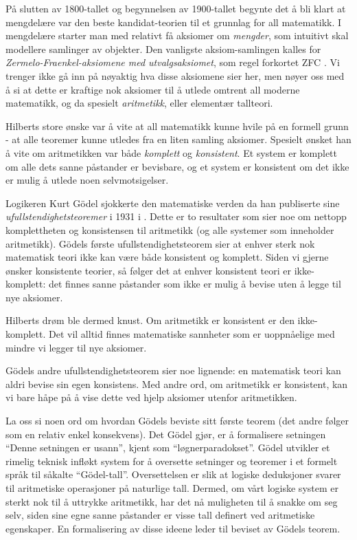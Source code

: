 \documentclass[12pt, norsk]{article}
\begin{document}
På slutten av 1800-tallet og begynnelsen av 1900-tallet begynte det å bli klart at mengdelære var den beste kandidat-teorien til et grunnlag for all matematikk. I mengdelære starter man med relativt få aksiomer om \emph{mengder}, som intuitivt skal modellere samlinger av objekter. Den vanligste aksiom-samlingen kalles for \emph{Zermelo-Fraenkel-aksiomene med utvalgsaksiomet}, som regel forkortet ZFC \cite{wiki_zfc}. Vi trenger ikke gå inn på nøyaktig hva disse aksiomene sier her, men nøyer oss med å si at dette er kraftige nok aksiomer til å utlede omtrent all moderne matematikk, og da spesielt \emph{aritmetikk}, eller elementær tallteori.

Hilberts store ønske var å vite at all matematikk kunne hvile på en formell grunn - at alle teoremer kunne utledes fra en liten samling aksiomer. Spesielt ønsket han å vite om aritmetikken var både \emph{komplett} og \emph{konsistent}. Et system er komplett om alle dets sanne påstander er bevisbare, og et system er konsistent om det ikke er mulig å utlede noen selvmotsigelser. 

Logikeren Kurt Gödel sjokkerte den matematiske verden da han publiserte sine \emph{ufullstendighetsteoremer} i 1931 i \cite{godel_formal}. Dette er to resultater som sier noe om nettopp komplettheten og konsistensen til aritmetikk (og alle systemer som inneholder aritmetikk). Gödels første ufullstendighetsteorem sier at enhver sterk nok matematisk teori ikke kan være både konsistent og komplett. Siden vi gjerne ønsker konsistente teorier, så følger det at enhver konsistent teori er ikke-komplett: det finnes sanne påstander som ikke er mulig å bevise uten å legge til nye aksiomer. 

Hilberts drøm ble dermed knust. Om aritmetikk er konsistent er den ikke-komplett. Det vil alltid finnes matematiske sannheter som er uoppnåelige med mindre vi legger til nye aksiomer.

Gödels andre ufullstendighetsteorem sier noe lignende: en matematisk teori kan aldri bevise sin egen konsistens. Med andre ord, om aritmetikk er konsistent, kan vi bare håpe på å vise dette ved hjelp aksiomer utenfor aritmetikken.

La oss si noen ord om hvordan Gödels beviste sitt første teorem (det andre følger som en relativ enkel konsekvens). Det Gödel gjør, er å formalisere setningen ``Denne setningen er usann'', kjent som ``løgnerparadokset''. Gödel utvikler et rimelig teknisk infløkt system for å oversette setninger og teoremer i et formelt språk til såkalte ``Gödel-tall''. Oversettelsen er slik at logiske deduksjoner svarer til aritmetiske operasjoner på naturlige tall. Dermed, om vårt logiske system er sterkt nok til å uttrykke aritmetikk, har det nå muligheten til å snakke om seg selv, siden sine egne sanne påstander er visse tall definert ved aritmetiske egenskaper. En formalisering av disse ideene leder til beviset av Gödels teorem.
\end{document}
